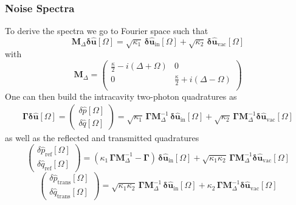 \subsubsection{Noise Spectra} 
To derive the spectra we go to Fourier space such that 
\begin{equation}
     \mathbf{M}_\Delta \mathbf{\delta \hat{u}}[\Omega]  = \sqrt{\kappa_{\mathrm{1}}} \, \mathbf{\delta \hat{u}_{\mathrm{in}}}[\Omega]  + \sqrt{\kappa_2} \, \mathbf{\delta \hat{u}_{\mathrm{vac}}}[\Omega]   
\end{equation}
with 
\begin{equation}
  \mathbf{M}_\Delta =\begin{pmatrix}
  \frac{\kappa}{2}-i(\Delta+\Omega) & 0 \\ 
  0 & \frac{\kappa}{2}+i(\Delta-\Omega)\\ 
  \end{pmatrix} 
\end{equation}
One can then build the intracavity two-photon quadratures as 
\begin{equation}
  \begin{split}
  \mathbf{\Gamma} \mathbf{\delta \hat{u}}[\Omega]  = \begin{pmatrix}
  \delta \hat{p}[\Omega] \\[2pt]
\delta \hat{q}[\Omega]
\end{pmatrix}  = \sqrt{\kappa_1} \, \mathbf{\Gamma} \mathbf{M}^{-1}_\Delta \, \mathbf{\delta \hat{u}_{\mathrm{in}}}[\Omega] +  \sqrt{\kappa_2} \,\mathbf{\Gamma}  \mathbf{M}^{-1}_\Delta  \mathbf{\delta \hat{u}_{\mathrm{vac}}}[\Omega] 
\end{split}
\end{equation}
as well as the reflected and transmitted quadratures 
\begin{equation}
  \begin{pmatrix}
  \delta \hat{p}_{\mathrm{ref}}[\Omega] \\[2pt]
\delta \hat{q}_{\mathrm{ref}}[\Omega]
\end{pmatrix}  = ( \kappa_1 \, \mathbf{\Gamma} \mathbf{M}^{-1}_\Delta - \mathbf{\Gamma} ) \, \mathbf{\delta \hat{u}_{\mathrm{in}}}[\Omega] +  \sqrt{\kappa_1 \kappa_2} \,\mathbf{\Gamma}  \mathbf{M}^{-1}_\Delta  \mathbf{\delta \hat{u}_{\mathrm{vac}}}[\Omega] 
\end{equation}
\begin{equation}
  \begin{pmatrix}
  \delta \hat{p}_{\mathrm{trans}}[\Omega] \\[2pt]
\delta \hat{q}_{\mathrm{trans}}[\Omega]
\end{pmatrix}  = \sqrt{\kappa_1 \kappa_2} \, \mathbf{\Gamma} \mathbf{M}^{-1}_\Delta \, \mathbf{\delta \hat{u}_{\mathrm{in}}}[\Omega] +  \kappa_2 \,\mathbf{\Gamma}  \mathbf{M}^{-1}_\Delta  \mathbf{\delta \hat{u}_{\mathrm{vac}}}[\Omega] 
\end{equation}



